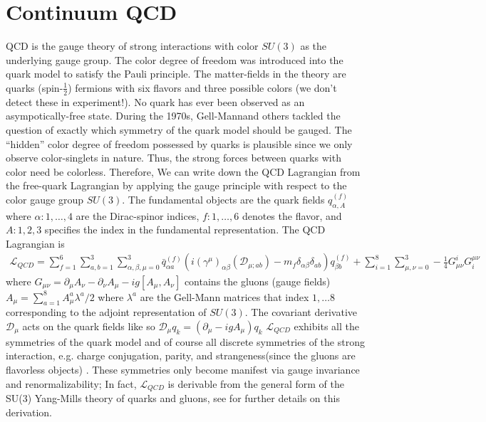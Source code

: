 \section{Continuum QCD}
QCD is the gauge theory of strong interactions with color $SU(3)$ as the underlying gauge group. The color degree of freedom was introduced into the quark model to satisfy the Pauli principle. The matter-fields in the theory are quarks (spin-$\frac{1}{2}$) fermions with six flavors and three possible colors (we don't detect these in experiment!). No quark has ever been observed as an asympotically-free state. During the 1970s, Gell-Mann\cite{Gell-Mann:1964ewy}and others \cite{PhysRevD.8.3633}\cite{PhysRevLett.31.494} tackled the question of exactly which symmetry of the quark model should be gauged. The ``hidden'' color degree of freedom possessed by quarks is plausible since we only observe color-singlets in nature. Thus, the strong forces between quarks with color need be colorless. Therefore, We can write down the QCD Lagrangian from the free-quark Lagrangian by applying the gauge principle with respect to the color gauge group $SU(3)$. The fundamental objects are the quark fields  $q_{\alpha,A}^{(f)}$ where $\alpha: 1,\dots,4$ are the Dirac-spinor indices, $f: 1,\dots,6$ denotes the flavor, and  $A: 1,2,3$ specifies the  index in the fundamental representation. 
The QCD Lagrangian is 
\begin{align}
    \mathcal{L}_{QCD} = \sum_{f=1}^{6} \sum_{a,b=1}^{3} \sum_{\alpha,\beta,\mu=0}^{3} \bar{q}_{\alpha a}^{(f)}(i(\gamma^\mu)_{\alpha \beta}(\mathcal{D}_{\mu;ab}) - m_f\delta_{\alpha \beta}\delta_{ab}) q_{\beta b}^{(f)} + \sum_{i=1}^{8}\sum_{\mu,\nu=0}^{3} -\frac{1}{4} G_{\mu\nu}^i G_i^{\mu\nu}
\end{align}
where $G_{\mu\nu} = \partial_\mu A_\nu - \partial_\nu A_\mu - ig[A_\mu,A_\nu]$ contains the gluons (gauge fields) $A_\mu = \sum_{a=1}^{8}A_\mu^a \lambda^a/2$ where $\lambda^a$ are the Gell-Mann matrices that index $1,\dots 8$ corresponding to the adjoint representation of $SU(3)$. The covariant derivative $\mathcal D_\mu$ acts on the quark fields like so $\mathcal D_\mu q_k = (\partial_\mu - igA_\mu)q_k$ 
$\mathcal{L}_{QCD}$ exhibits all the symmetries of the quark model and of course all discrete symmetries of the strong interaction, e.g. charge conjugation, parity, and strangeness(since the gluons are flavorless objects) \cite{Cheng1984GaugeTO}. These symmetries only become manifest via gauge invariance and renormalizability; In fact, $\mathcal{L}_{QCD}$ is derivable from the general form of the SU(3) Yang-Mills theory of quarks and gluons, see \cite{Cheng1984GaugeTO} for further details on this derivation. 

